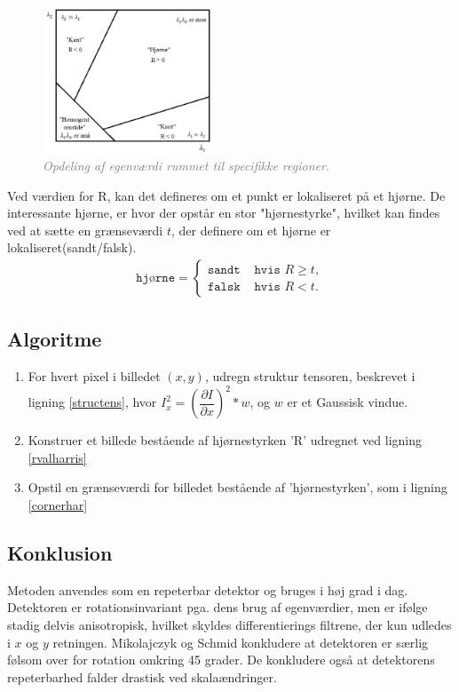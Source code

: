 \begin{enumerate}
{\begin{figure}[H]
    \centering
    \includegraphics[width=0.45\textwidth]{fig/26.png}
     \vspace{-1em}
    \begin{center}    
       \caption{\textcolor{gray}{\footnotesize \textit{ Opdeling af egenværdi rummet til specifikke regioner. }}}
    \label{fig:egen}
     \end{center}
     \vspace{-2.5em}
  \end{figure} \noindent
Ved værdien for R, kan det defineres om et punkt er lokaliseret på et hjørne. De interessante hjørne, er hvor der opstår en stor "hjørnestyrke", hvilket kan findes ved at sætte en grænseværdi $t$, der definere om et hjørne er lokaliseret(sandt/falsk).
\begin{equation}
\begin{split}
\texttt{hjørne} = 
\begin{cases}
\texttt{sandt}& \texttt{hvis } R\geq t, \\
\texttt{falsk }& \texttt{hvis } R < t.
\end{cases}
\end{split}
\label{cornerhar}
\end{equation}
}
\end{enumerate}
\subsection{Algoritme}
\begin{enumerate}
\item{ For hvert pixel i billedet $(x,y)$, udregn struktur tensoren, beskrevet i ligning \eqref{structens}, hvor $ I_x^2 = (\dfrac{\partial I}{\partial x})^2 \ast w$, og $w$ er et Gaussisk vindue.}
\item{ Konstruer et billede bestående af hjørnestyrken 'R' udregnet ved ligning \eqref{rvalharris}}
\item{ Opstil en grænseværdi for billedet bestående af 'hjørnestyrken', som i ligning \eqref{cornerhar}}
\end{enumerate}
\subsection{Konklusion}
Metoden anvendes som en repeterbar detektor og bruges i høj grad i dag. Detektoren er rotationsinvariant pga. dens brug af egenværdier, men er ifølge \cite{eval} stadig delvis anisotropisk, hvilket skyldes differentierings filtrene, der kun udledes i $x$ og $y$ retningen. Mikolajczyk og Schmid \cite{eval} konkludere at detektoren er særlig følsom over for rotation omkring 45 grader. De konkludere også at detektorens repeterbarhed falder drastisk ved skalaændringer.